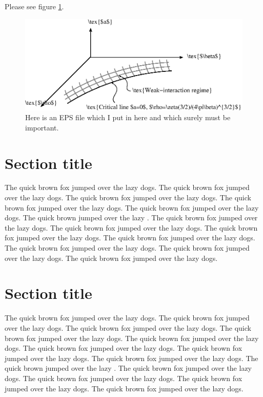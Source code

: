 Please see figure \ref{fig:important}.

\begin{figure}[!htb]
\begin{center}
\psfragscanon
\includegraphics{figures/critical_manifold.eps}
\caption[Short caption for the list of figures.]
	{Here is an EPS file which I put in here and which surely must be
	important.
	\label{fig:important}}
\end{center}
\end{figure}

\section{Section title}
\label{sec:yet_another_section}

The quick brown fox jumped over the lazy dogs.
The quick brown fox jumped over the lazy dogs.
The quick brown fox jumped over the lazy dogs.
The quick brown fox jumped over the lazy dogs.
The quick brown fox jumped over the lazy dogs.
The quick brown  jumped over the lazy .
The quick brown fox jumped over the lazy dogs.
The quick brown fox jumped over the lazy dogs.
The quick brown fox jumped over the lazy dogs.
The quick brown fox jumped over the lazy dogs.
The quick brown fox jumped over the lazy dogs.
The quick brown fox jumped over the lazy dogs.
The quick brown fox jumped over the lazy dogs.

\section{Section title}
\label{sec:last_section}

The quick brown fox jumped over the lazy dogs.
The quick brown fox jumped over the lazy dogs.
The quick brown fox jumped over the lazy dogs.
The quick brown fox jumped over the lazy dogs.
The quick brown fox jumped over the lazy dogs.
The quick brown fox jumped over the lazy dogs.
The quick brown fox jumped over the lazy dogs.
The quick brown fox jumped over the lazy dogs.
The quick brown  jumped over the lazy .
The quick brown fox jumped over the lazy dogs.
The quick brown fox jumped over the lazy dogs.
The quick brown fox jumped over the lazy dogs.
The quick brown fox jumped over the lazy dogs.
